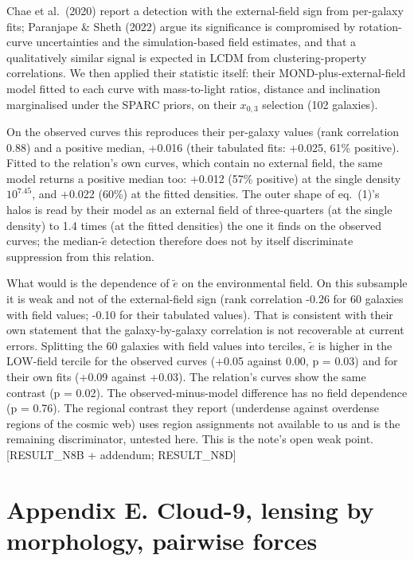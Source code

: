 \documentclass[
  10pt,
]{article}
\begin{document}
Chae et al.~(2020) report a detection with the external-field sign from per-galaxy fits; Paranjape \& Sheth (2022) argue its significance is compromised by rotation-curve uncertainties and the simulation-based field estimates, and that a qualitatively similar signal is expected in LCDM from clustering-property correlations. We then applied their statistic itself: their MOND-plus-external-field model fitted to each curve with mass-to-light ratios, distance and inclination marginalised under the SPARC priors, on their $x_{0,3}$ selection (102 galaxies).

On the observed curves this reproduces their per-galaxy values (rank correlation 0.88) and a positive median, +0.016 (their tabulated fits: +0.025, 61\% positive). Fitted to the relation's own curves, which contain no external field, the same model returns a positive median too: +0.012 (57\% positive) at the single density $10^{7.45}$, and +0.022 (60\%) at the fitted densities. The outer shape of eq.~(1)'s halos is read by their model as an external field of three-quarters (at the single density) to 1.4 times (at the fitted densities) the one it finds on the observed curves; the median-$\tilde e$ detection therefore does not by itself discriminate suppression from this relation.

What would is the dependence of $\tilde e$ on the environmental field. On this subsample it is weak and not of the external-field sign (rank correlation -0.26 for 60 galaxies with field values; -0.10 for their tabulated values). That is consistent with their own statement that the galaxy-by-galaxy correlation is not recoverable at current errors. Splitting the 60 galaxies with field values into terciles, $\tilde e$ is higher in the LOW-field tercile for the observed curves (+0.05 against 0.00, p = 0.03) and for their own fits (+0.09 against +0.03). The relation's curves show the same contrast (p = 0.02). The observed-minus-model difference has no field dependence (p = 0.76). The regional contrast they report (underdense against overdense regions of the cosmic web) uses region assignments not available to us and is the remaining discriminator, untested here. This is the note's open weak point. {[}RESULT\_N8B + addendum; RESULT\_N8D{]}

\section{Appendix E. Cloud-9, lensing by morphology, pairwise forces}\label{appendix-e.-cloud-9-lensing-by-morphology-pairwise-forces}
\end{document}
